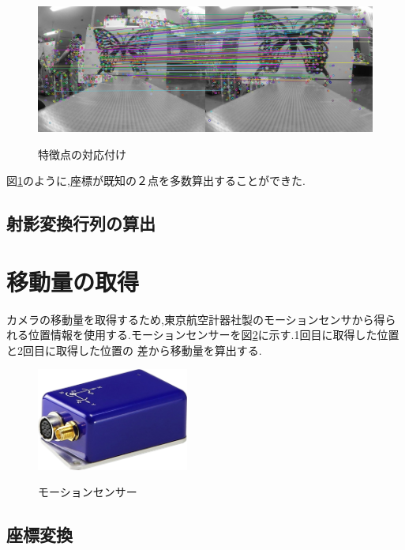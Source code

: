 \documentclass[12pt,oneside]{sotsuken_paper}
\begin{document}
\begin{figure}[htp]
 \begin{center}
  \includegraphics[width=120mm]{img/soft/chou.png}
 　\caption{特徴点の対応付け}
  \label{fig:chou}%
 \end{center}
\end{figure}

図\ref{fig:chou}のように,座標が既知の２点を多数算出することができた.

\subsection{射影変換行列の算出}
\section{移動量の取得}
カメラの移動量を取得するため,東京航空計器社製のモーションセンサから得られる位置情報を使用する.モーションセンサーを図\ref{fig:motion}に示す.1回目に取得した位置と2回目に取得した位置の
差から移動量を算出する.

\begin{figure}[htp]
 \begin{center}
  \includegraphics[width=50mm]{img/soft/motion.jpg}
 　\caption{モーションセンサー}
  \label{fig:motion}%
 \end{center}
\end{figure}

\subsection{座標変換}
\end{document}

